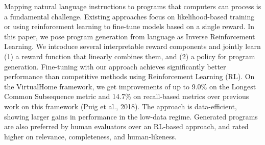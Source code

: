 Mapping natural language instructions to programs that computers can process is a fundamental challenge. Existing approaches focus on likelihood-based training or using reinforcement learning to fine-tune models based on a single reward. In this paper, we pose program generation from language as Inverse Reinforcement Learning. We introduce several interpretable reward components and jointly learn (1) a reward function that linearly combines them, and (2) a policy for program generation. Fine-tuning with our approach achieves significantly better performance than competitive methods using Reinforcement Learning (RL). On the VirtualHome framework, we get improvements of up to 9.0\% on the Longest Common Subsequence metric and 14.7\% on recall-based metrics over previous work on this framework (Puig et al.,  2018). The approach is data-efficient, showing larger gains in performance in the low-data regime. Generated programs are also preferred by human evaluators over an RL-based approach, and rated higher on relevance, completeness, and human-likeness.
